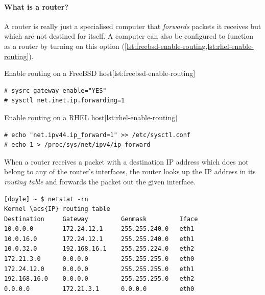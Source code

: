 \paragraph{What is a router?}
A router is really just a specialised computer that \emph{forwards} packets it receives but which are not destined for itself.
A computer can also be configured to function as a router by turning on this option (\vref{lst:freebsd-enable-routing,lst:rhel-enable-routing}).

\begin{fltlisting}[h!]
\begin{sidecaption}{Enable routing on a FreeBSD host}[lst:freebsd-enable-routing]
\begin{lstlisting}
# sysrc gateway_enable="YES"
# sysctl net.inet.ip.forwarding=1
\end{lstlisting}
\end{sidecaption}
\end{fltlisting}

\begin{fltlisting}[h!]
\begin{sidecaption}{Enable routing on a \acs{RHEL} host}[lst:rhel-enable-routing]
\begin{lstlisting}
# echo "net.ipv44.ip_forward=1" >> /etc/sysctl.conf
# echo 1 > /proc/sys/net/ipv4/ip_forward
\end{lstlisting}
\end{sidecaption}
\end{fltlisting}

When a router receives a packet with a destination \acs{IP} address which does not belong to any of the router's interfaces, the router looks up the \acs{IP} address in its \emph{routing table} and forwards the packet out the given interface.%

\newsavebox{\lstrouterThree}
\begin{lrbox}{\lstrouterThree}
\begin{lstlisting}[caption={The routing table on a linux machine},label={fig:routing-table}]
[doyle] ~ $ netstat -rn
Kernel \acs{IP} routing table
Destination     Gateway         Genmask         Iface
10.0.0.0        172.24.12.1     255.255.240.0   eth1
10.0.16.0       172.24.12.1     255.255.240.0   eth1
10.0.32.0       192.168.16.1    255.255.224.0   eth2
172.21.3.0      0.0.0.0         255.255.255.0   eth0
172.24.12.0     0.0.0.0         255.255.255.0   eth1
192.168.16.0    0.0.0.0         255.255.255.0   eth2
0.0.0.0         172.21.3.1      0.0.0.0         eth0
\end{lstlisting}
\end{lrbox}
\noindent
\usebox\lstrouterThree


